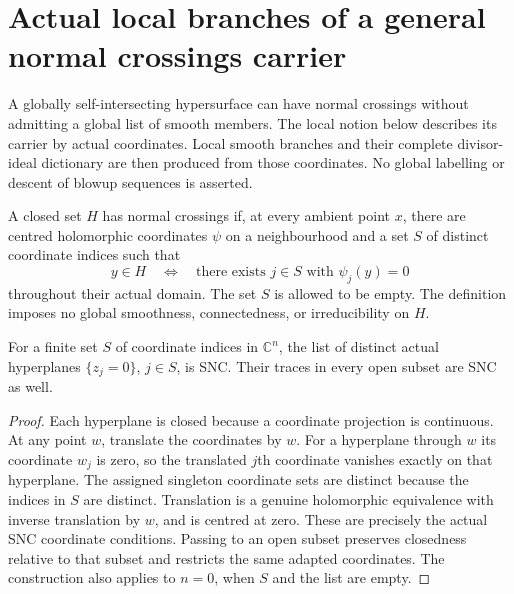 \section{Actual local branches of a general normal crossings carrier}
\label{sec:hironaka-general-nc-local-branches}

A globally self-intersecting hypersurface can have normal crossings
without admitting a global list of smooth members.  The local notion
below describes its carrier by actual coordinates.  Local smooth
branches and their complete divisor-ideal dictionary are then produced
from those coordinates.  No global labelling or descent of blowup
sequences is asserted.

\begin{definition}
\label{hir:general-normal-crossings-carrier}
\leanok
A closed set $H$ has normal crossings if, at every ambient point $x$,
there are centred holomorphic coordinates $\psi$ on a neighbourhood
and a set $S$ of distinct coordinate indices such that
\[
 y\in H\quad\Longleftrightarrow\quad
 \text{there exists }j\in S\text{ with }\psi_j(y)=0
\]
throughout their actual domain.  The set $S$ is allowed to be empty.
The definition imposes no global smoothness, connectedness, or
irreducibility on $H$.
\end{definition}

\begin{lemma}
\label{hir:actual-coordinate-hyperplane-snc-list}
\leanok
For a finite set $S$ of coordinate indices in $\mathbb C^n$, the list
of distinct actual hyperplanes $\{z_j=0\}$, $j\in S$, is SNC.  Their
traces in every open subset are SNC as well.
\end{lemma}
\begin{proof}
Each hyperplane is closed because a coordinate projection is continuous.
At any point $w$, translate the coordinates by $w$.  For a hyperplane
through $w$ its coordinate $w_j$ is zero, so the translated $j$th
coordinate vanishes exactly on that hyperplane.  The assigned singleton
coordinate sets are distinct because the indices in $S$ are distinct.
Translation is a genuine holomorphic equivalence with inverse translation
by $w$, and is centred at zero.  These are precisely the actual SNC
coordinate conditions.  Passing to an open subset preserves closedness
relative to that subset and restricts the same adapted coordinates.
The construction also applies to $n=0$, when $S$ and the list are empty.
\end{proof}

